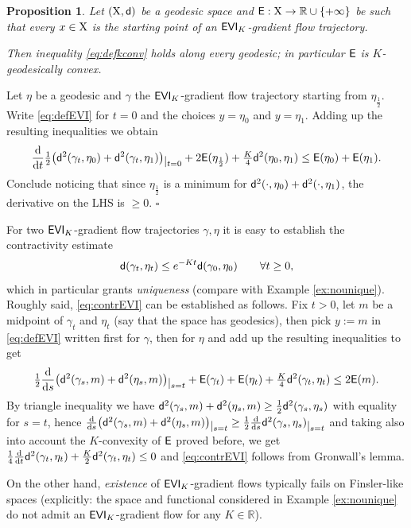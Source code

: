 \documentclass[11pt]{article}
\numberwithin{equation}{section}
\newtheorem{proposition}[theorem]{Proposition}
\newenvironment{idea}{\removelastskip\par\medskip   %
\noindent{\em Idea of the proof} \rm}{\penalty-20\null\hfill$\square$\par\medbreak}
\newcommand{\R}{\mathbb{R}}
\newcommand{\restr}[1]{\lower3pt\hbox{$|_{#1}$}}
\newcommand{\X}{{\rm X}}
\newcommand{\sfd}{{\sf d}}
\renewcommand{\d}{{\rm d}}
\newcommand{\E}{{\sf E}} %
\newcommand{\EVI}{{\sf EVI}}
\begin{document}
\begin{proposition}\label{prop:EVIconv}
Let $(\X,\sfd)$ be a geodesic space and $\E:\X\to\R\cup\{+\infty\}$ be such that every $x\in\X$ is the starting point of an $\EVI_K$-gradient flow trajectory. 

Then inequality \eqref{eq:defkconv} holds along \emph{every} geodesic; in particular $\E$ is $K$-geodesically convex.
\end{proposition}
\begin{idea}Let $\eta$ be a geodesic and $\gamma$ the $\EVI_K$-gradient flow trajectory starting from $\eta_{\frac 12}$. Write \eqref{eq:defEVI} for $t=0$ and the choices $y=\eta_0$ and $y=\eta_1$. Adding up the resulting inequalities we obtain
\[
\frac{\d}{\d t}\tfrac12\big(\sfd^2(\gamma_t,\eta_0)+\sfd^2(\gamma_t,\eta_1)\big)\restr{t=0}+2\E(\eta_{\frac12})+\tfrac K4\sfd^2(\eta_0,\eta_1)\leq \E(\eta_0)+\E(\eta_1).
\]
Conclude noticing that since $\eta_{\frac12}$ is a minimum for $\sfd^2(\cdot,\eta_0)+\sfd^2(\cdot,\eta_1)$, the derivative on the LHS is $\geq 0$.
\end{idea}
For two $\EVI_K$-gradient flow trajectories $\gamma,\eta$ it is easy to establish the contractivity estimate
\begin{equation}
\label{eq:contrEVI}
\sfd(\gamma_t,\eta_t)\leq e^{-Kt}\sfd(\gamma_0,\eta_0)\qquad\forall t\geq0,
\end{equation}
which in particular grants \emph{uniqueness} (compare with Example \ref{ex:nounique}). Roughly said, \eqref{eq:contrEVI} can be established as follows. Fix $t>0$, let $m$ be a midpoint of $\gamma_t$ and $\eta_t$ (say that the space has geodesics), then pick $y:=m$ in \eqref{eq:defEVI} written first for $\gamma$, then for $\eta$ and add up the resulting inequalities to get 
\[
\tfrac12\frac\d{\d s}\big(\sfd^2(\gamma_s,m)+\sfd^2(\eta_s,m)\big)\restr{s=t}+\E(\gamma_t)+\E(\eta_t)+ \tfrac K4\sfd^2(\gamma_t,\eta_t) \leq 2\E(m).
\]
By triangle inequality we have $\sfd^2(\gamma_s,m)+\sfd^2(\eta_s,m)\geq \frac12\sfd^2(\gamma_s,\eta_s)$ with equality for $s=t$, hence $\frac\d{\d s}\big(\sfd^2(\gamma_s,m)+\sfd^2(\eta_s,m)\big)\restr{s=t}\geq \tfrac12\frac\d{\d s}\sfd^2(\gamma_s,\eta_s)\restr{s=t}$ and taking also into account the $K$-convexity of $\E$ proved before, we get  $\frac14\frac\d{\d t}\sfd^2(\gamma_t,\eta_t)+\frac K2\sfd^2(\gamma_t,\eta_t)\leq 0$ and \eqref{eq:contrEVI} follows from Gronwall's lemma.

On the other hand, \emph{existence} of $\EVI_K$-gradient flows typically fails on Finsler-like spaces (explicitly: the space and functional considered in Example \ref{ex:nounique} do not admit an $\EVI_K$-gradient flow for any $K\in\R$).
\end{document}

